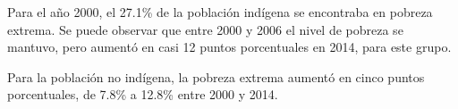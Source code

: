  Para el año 2000, el 27.1\%  de la población indígena se encontraba en pobreza extrema. Se puede observar que entre 2000 y 2006 el nivel de pobreza se mantuvo, pero aumentó en  casi  12 puntos porcentuales en 2014, para este grupo.
 
  Para la población no indígena, la pobreza extrema aumentó en cinco puntos porcentuales, de 7.8\% a 12.8\% entre 2000 y 2014.
